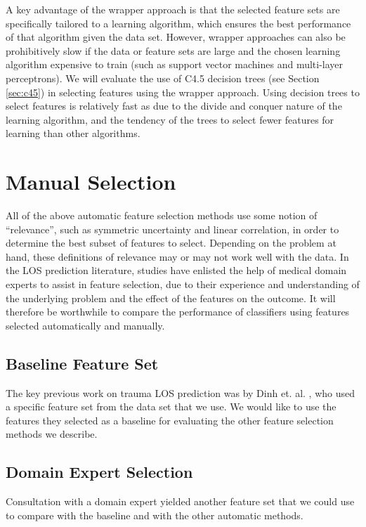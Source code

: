 A key advantage of the wrapper approach is that the selected feature sets are
specifically tailored to a learning algorithm, which ensures the best
performance of that algorithm given the data set. However, wrapper approaches
can also be prohibitively slow if the data or feature sets are large and the
chosen learning algorithm expensive to train (such as support vector machines
and multi-layer perceptrons). We will evaluate the use of C4.5 decision trees
(see Section \ref{sec:c45}) in selecting features using the wrapper approach.
Using decision trees to select features is relatively fast as due to the
divide and conquer nature of the learning algorithm, and the tendency of the
trees to select fewer features for learning than other algorithms.

\section{Manual Selection}
\label{sec:manual}
All of the above automatic feature selection methods use some notion of
``relevance'', such as symmetric uncertainty and linear correlation,
in order to determine the best subset of features to select.
Depending on the problem at hand, these definitions of relevance may or may
not work well with the data. In the LOS prediction literature, studies
have enlisted the help of medical domain experts to assist in feature
selection, due to their experience and understanding of the underlying
problem and the effect of the features on the outcome. It will therefore be
worthwhile to compare the performance of classifiers using features selected
automatically and manually.

\subsection{Baseline Feature Set}
The key previous work on trauma LOS prediction was by Dinh et. al.
\cite{Dinh2013a}, who used a specific feature set from the data set that we
use. We would like to use the features they selected as a baseline for
evaluating the other feature selection methods we describe.

\subsection{Domain Expert Selection}
Consultation with a domain expert yielded another feature set that we could
use to compare with the baseline and with the other automatic methods.

